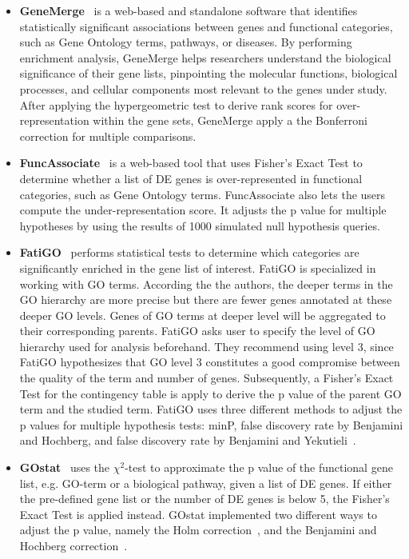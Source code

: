 \documentclass[Minh_PhD_thesis.tex]{subfiles}
\begin{document}
\begin{itemize}
\item \textbf{GeneMerge}~\cite{Castillo-Davis:2002} is a web-based and standalone software that identifies statistically significant associations between genes and functional categories, such as Gene Ontology terms, pathways, or diseases. By performing enrichment analysis, GeneMerge helps researchers understand the biological significance of their gene lists, pinpointing the molecular functions, biological processes, and cellular components most relevant to the genes under study. After applying the hypergeometric test to derive rank scores for over-representation within the gene sets, GeneMerge apply a the Bonferroni correction for multiple comparisons.

\item \textbf{FuncAssociate}~\cite{Berriz:2003} is a web-based tool that uses Fisher's Exact Test to determine whether a list of DE genes is over-represented in functional categories, such as Gene Ontology terms. FuncAssociate also lets the users compute the under-representation score. It adjusts the p value for multiple hypotheses by using the results of 1000 simulated null hypothesis queries.

\item \textbf{FatiGO}~\cite{Al-Shahrour:2004} performs statistical tests to determine which categories are significantly enriched in the gene list of interest. FatiGO is specialized in working with GO terms. According the the authors, the deeper terms in the GO hierarchy are more precise but there are fewer genes annotated at these deeper GO levels. Genes of GO terms at deeper level will be aggregated to their corresponding parents. FatiGO asks user to specify the level of GO hierarchy used for analysis beforehand. They recommend using level 3, since FatiGO hypothesizes that GO level 3 constitutes a good compromise between the quality of the term and number of genes. Subsequently, a Fisher's Exact Test for the contingency table is apply to derive the p value of the parent GO term and the studied term. FatiGO uses three different methods to adjust the p values for multiple hypothesis tests: minP\cite{Westfall:1993}, false discovery rate by Benjamini and Hochberg\cite{Benjamini:1995}, and false discovery rate by Benjamini and Yekutieli~\cite{Benjamini:2001}.

\item \textbf{GOstat}~\cite{Beissbarth:2004} uses the $\chi^2$-test to approximate the p value of the functional gene list, e.g. GO-term or a biological pathway, given a list of DE genes. If either the pre-defined gene list or the number of DE genes is below 5, the Fisher's Exact Test is applied instead. GOstat implemented two different ways to adjust the p value, namely the Holm correction~\cite{Holm:1979}, and the Benjamini and Hochberg correction~\cite{Benjamini:1995}.


\end{itemize}
\end{document}
